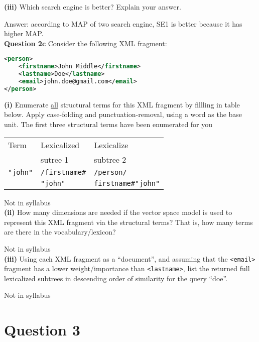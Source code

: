 \documentclass[11pt,a4paper]{report}
\begin{document}
\begin{multicols*}{2}
\noindent \textbf{(iii)} Which search engine is better? Explain your answer.

\noindent Answer: according to MAP of two search engine, SE1 is better because it has higher MAP. \\

\noindent \textbf{Question 2c} Consider the following XML fragment:

\begin{lstlisting}[language=XML]
<person>
    <firstname>John Middle</firstname>
    <lastname>Doe</lastname>
    <email>john.doe@gmail.com</email>
</person>
\end{lstlisting}

\noindent \textbf{(i)} Enumerate \underline{all} structural terms for this XML fragment by fillling in table below. Apply case-folding and punctuation-removal, using a word as the base unit. The first three structural terms have been enumerated for you

\begin{center}
\begin{tabular}{| l | l | l |}
    \hline
    Term & Lexicalized & Lexicalize \\
         & sutree 1    & subtree 2  \\
    \hline
    \verb|"john"| & \verb|/firstname#| & \verb|/person/|\\
                  & \verb|"john"|      & \verb|firstname#"john"| \\
    \hline
\end{tabular}
\end{center}

\noindent Not in syllabus\\

\noindent \textbf{(ii)} How many dimensions are needed if the vector space model is used to represent this XML fragment via the structural terms? That is, how many terms are there in the vocabulary/lexicon?

\noindent Not in syllabus\\

\noindent \textbf{(iii)} Using each XML fragment as a ``document'', and assuming that the \verb|<email>| fragment has a lower weight/importance than \verb|<lastname>|, list the returned full lexicalized subtrees in descending order of similarity for the query ``doe''.

\noindent Not in syllabus

\section{Question 3}


\end{multicols*}
\end{document}
